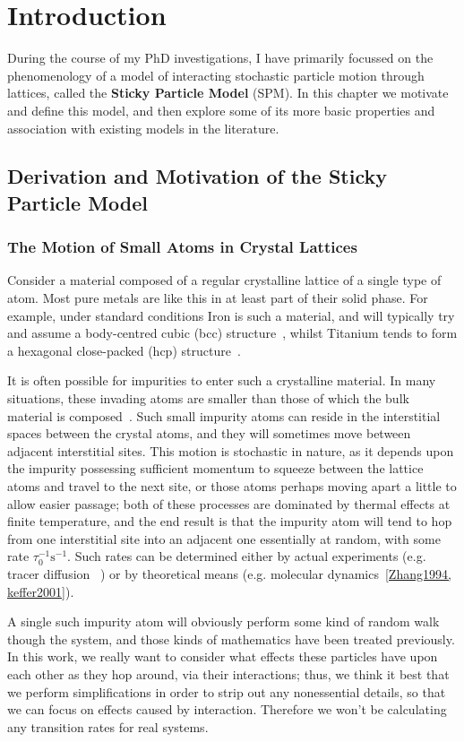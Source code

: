 \chapter{Introduction}
During the course of my PhD investigations, I have primarily focussed on the phenomenology of a model of
interacting stochastic particle motion through lattices, called the \textbf{Sticky Particle Model} (SPM). In
this chapter we motivate and define this model, and then explore some of its more basic properties and
association with existing models in the literature.

\section{Derivation and Motivation of the Sticky Particle Model}
\subsection{The Motion of Small Atoms in Crystal Lattices}
Consider a material composed of a regular crystalline lattice of a single type of atom. Most pure metals
are like this in at least part of their solid phase. For example, under standard conditions Iron is such
a material, and will typically try and assume a body-centred cubic (bcc) structure~\cite{Villars2016}, whilst Titanium tends to
form a hexagonal close-packed (hcp) structure~\cite{Patterson1925}.

It is often possible for impurities to enter such a crystalline material.  In many
situations, these invading atoms are smaller than those of
which the bulk material is composed~\cite{DealGrove1965, tegner2015}. Such small impurity atoms can reside in the interstitial spaces between 
the crystal atoms, and they will sometimes move between adjacent interstitial sites. This motion is
stochastic in nature, as it depends upon the impurity possessing sufficient momentum to squeeze between
the lattice atoms and travel to the next site, or those atoms perhaps moving apart a little to allow easier
passage; both of these processes are dominated by thermal effects at finite temperature, and the end result
is that the impurity atom will tend to hop from one interstitial site into an
adjacent one essentially at random, with some rate $\tau_0 ^{-1} \mathrm{s}^{-1}$.
Such rates can be determined either by actual experiments (e.g. tracer diffusion
~\cite{Lamb1946, Wersin2004}) or by theoretical means
(e.g. molecular dynamics~\ref{Zhang1994, keffer2001}).

A single such impurity atom will obviously perform some kind of random walk though the system, and those kinds
of mathematics have been treated previously. In this work, we really want to consider what effects these
particles have upon each other as they hop around, via their interactions; thus, we think it best that we
perform simplifications in order to strip out any nonessential details, so that we can focus on effects 
caused by interaction. Therefore we won't be calculating any
transition rates for real systems.

